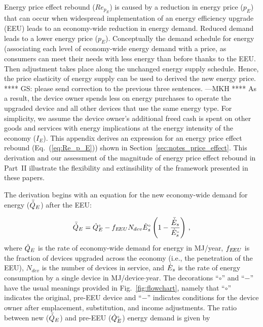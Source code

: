 

Energy price effect rebound ($Re_{p_E}$) is caused by a reduction 
in energy price ($p_E$)
that can occur when widespread implementation 
of an energy efficiency upgrade (EEU)
leads to an economy-wide reduction in energy demand.
Reduced demand leads 
to a lower energy price ($p_E$).
%
Conceptually the demand schedule for energy
(associating each level of economy-wide energy demand with a price, 
as consumers can meet their needs with less energy than before thanks to the EEU. 
Then adjustment takes place along the unchanged energy supply schedule.
Hence, the price elasticity of energy supply
can be used to derived the new energy price.
**** GS: please send correction to the previous three sentences. ---MKH ****
%
As a result, the device owner spends less on energy purchases
to operate the upgraded device
and all other devices that use the same energy type.
For simplicity, 
we assume the device owner's additional freed cash
is spent on other goods and services
with energy implications 
at the energy intensity of the economy ($I_E$).
This appendix derives an expression for an
energy price effect rebound (Eq.~(\ref{eq:Re_p_E}))
shown in Section~\ref{sec:notes_price_effect}.
This derivation and our assessment 
of the magnitude of energy price effect rebound
in Part~II
illustrate the flexibility and extinsibility of the framework
presented in these papers.

The derivation begins with an equation for the new economy-wide 
demand for energy ($\bar{\dot{Q}}_E$) after the EEU:

\begin{equation}
  \bar{\dot{Q}}_E = {}{\dot{Q}}^{\scriptscriptstyle \circ}_E - f_{E\!EU} N_{dev} {}{\dot{E}}^{\scriptscriptstyle \circ}_s \left( 1 - \frac{\bar{\dot{E}}_s}{{}{\dot{E}}^{\scriptscriptstyle \circ}_s} \right) \, ,
\end{equation}
%
where
$\dot{Q}_E$ is the rate of economy-wide demand for energy in MJ/year,
$f_{E\!EU}$ is the fraction of devices upgraded across the economy
(i.e., the penetration of the EEU),
$N_{dev}$ is the number of devices in service, and
$\dot{E}_s$ is the rate of energy consumption by a single device in MJ/device$\cdot$year.
The decorations ``$\circ$'' and ``$-$'' have the usual meanings
provided in Fig.~\ref{fig:flowchart}, namely that
``$\circ$'' indicates the original, pre-EEU device and
``$-$'' indicates conditions for the device owner after
emplacement, substitution, and income
adjustments.
The ratio between
new ($\bar{\dot{Q}}_E$) and
pre-EEU (${}{\dot{Q}}^{\scriptscriptstyle \circ}_E$)
energy demand is given by


